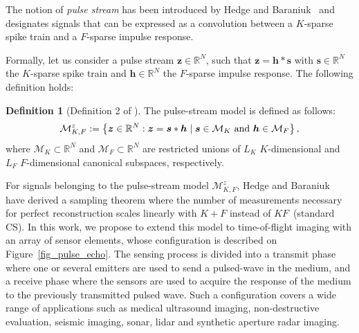 \documentclass{article}
\newcommand{\etal}{\textit{et al.}}
\newcommand{\vect}[1]{\bm{#1}}
\theoremstyle{definition}
\newtheorem{defn}{Definition}
\begin{document}
The notion of \textit{pulse stream} has been introduced by Hedge and Baraniuk~\cite{Hedge_TSP_2011} and designates signals that can be expressed as a convolution between a $K$-sparse spike train and a $F$-sparse impulse response. 
%
%

Formally, let us consider a pulse stream $\vect{z} \in \mathbb{R}^N$, such that $\vect{z} = \vect{h} \ast \vect{s}$ with $\vect{s} \in \mathbb{R}^N$ the $K$-sparse spike train and $\vect{h} \in \mathbb{R}^N$ the $F$-sparse impulse response. 
The following definition holds:
\begin{defn}[Definition 2 of \cite{Hedge_TSP_2011}]	
The pulse-stream model is defined as follows:
\begin{equation}
\label{eq_pulse_stream_model}
\mathcal{M}^z_{K,F}:=\left\lbrace \vect{z} \in \mathbb{R}^N: \vect{z} = \vect{s} \ast \vect{h} \; | \; \vect{s} \in \mathcal{M}_K \textnormal{ and } \vect{h} \in \mathcal{M}_F \right \rbrace,
\end{equation}
where $\mathcal{M}_K \subset \mathbb{R}^N$ and $\mathcal{M}_F \subset \mathbb{R}^N$ are restricted unions of $L_K$ $K$-dimensional and $L_F$ $F$-dimensional canonical subspaces, respectively.
\end{defn} 

For signals belonging to the pulse-stream model $\mathcal{M}^z_{K,F}$, Hedge and Baraniuk~\cite{Hedge_TSP_2011} have derived a sampling theorem where the number of measurements necessary for perfect reconstruction scales linearly with $K + F$ instead of $KF$~(standard CS). 
In this work, we propose to extend this model to time-of-flight imaging with an array of sensor elements, whose configuration is described on Figure~\ref{fig_pulse_echo}. 
The sensing process is divided into a transmit phase where one or several emitters are used to send a pulsed-wave in the medium, and a receive phase where the sensors are used to acquire the response of the medium to the previously transmitted pulsed wave. 
Such a configuration covers a wide range of applications such as medical ultrasound imaging, non-destructive evaluation, seismic imaging, sonar, lidar and synthetic aperture radar imaging.
\end{document}
